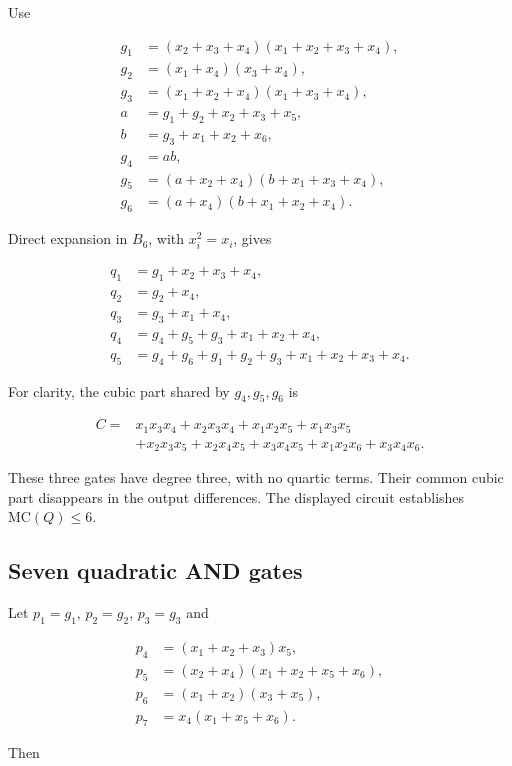 Use

\[\begin{aligned}
g_1&=(x_2+x_3+x_4)(x_1+x_2+x_3+x_4),\\
g_2&=(x_1+x_4)(x_3+x_4),\\
g_3&=(x_1+x_2+x_4)(x_1+x_3+x_4),\\
a&=g_1+g_2+x_2+x_3+x_5,\\
b&=g_3+x_1+x_2+x_6,\\
g_4&=ab,\\
g_5&=(a+x_2+x_4)(b+x_1+x_3+x_4),\\
g_6&=(a+x_4)(b+x_1+x_2+x_4).
\end{aligned}\]

Direct expansion in $B_6$, with $x_i^2=x_i$, gives

\[\begin{aligned}
q_1&=g_1+x_2+x_3+x_4,\\
q_2&=g_2+x_4,\\
q_3&=g_3+x_1+x_4,\\
q_4&=g_4+g_5+g_3+x_1+x_2+x_4,\\
q_5&=g_4+g_6+g_1+g_2+g_3+x_1+x_2+x_3+x_4.
\end{aligned}\]

For clarity, the cubic part shared by $g_4,g_5,g_6$ is

\[\begin{aligned}
C={}&x_1x_3x_4+x_2x_3x_4+x_1x_2x_5+x_1x_3x_5\\
 &+x_2x_3x_5+x_2x_4x_5+x_3x_4x_5+x_1x_2x_6+x_3x_4x_6.
\end{aligned}\]

These three gates have degree three, with no quartic terms. Their common cubic part disappears in the output differences. The displayed circuit establishes $\mathrm{MC}(Q)\le6$.

\subsection*{Seven quadratic AND gates}

Let $p_1=g_1$, $p_2=g_2$, $p_3=g_3$ and

\[\begin{aligned}
p_4&=(x_1+x_2+x_3)x_5,\\
p_5&=(x_2+x_4)(x_1+x_2+x_5+x_6),\\
p_6&=(x_1+x_2)(x_3+x_5),\\
p_7&=x_4(x_1+x_5+x_6).
\end{aligned}\]

Then

